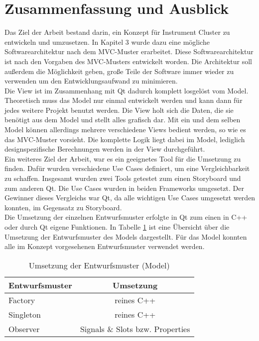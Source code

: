 \section{Zusammenfassung und Ausblick}\label{ausblick}

Das Ziel der Arbeit bestand darin, ein Konzept für Instrument Cluster zu entwickeln und umzusetzen. In Kapitel 3 wurde dazu eine mögliche Softwarearchitektur nach dem \ac{MVC}-Muster erarbeitet. Diese Softwarearchitektur ist nach den Vorgaben des \ac{MVC}-Musters entwickelt worden. Die Architektur soll außerdem die Möglichkeit geben, große Teile der Software immer wieder zu verwenden um den Entwicklungsaufwand zu minimieren.\\

Die View ist im Zusammenhang mit Qt dadurch komplett losgelöst vom Model. Theoretisch muss das Model nur einmal entwickelt werden und kann dann für jedes weitere Projekt benutzt werden. Die View holt sich die Daten, die sie benötigt aus dem Model und stellt alles grafisch dar. Mit ein und dem selben Model können allerdings mehrere verschiedene Views bedient werden, so wie es das \ac{MVC}-Muster vorsieht. Die komplette Logik liegt dabei im Model, lediglich designspezifische Berechnungen werden in der View durchgeführt.\\

Ein weiteres Ziel der Arbeit, war es ein geeignetes Tool für die Umsetzung zu finden. Dafür wurden verschiedene Use Cases definiert, um eine Vergleichbarkeit zu schaffen. Insgesamt wurden zwei Tools getestet zum einen Storyboard und zum anderen Qt. Die Use Cases wurden in beiden Frameworks umgesetzt. Der Gewinner dieses Vergleichs war Qt, da alle wichtigen Use Cases umgesetzt werden konnten, im Gegensatz zu Storyboard.\\

Die Umsetzung der einzelnen Entwurfsmuster erfolgte in Qt zum einen in C++ oder durch Qt eigene Funktionen. In Tabelle \ref{tab:patterns_model} ist eine Übersicht über die Umsetzung der Entwurfsmuster des Models dargestellt. Für das Model konnten alle im Konzept vorgesehenen Entwurfsmuster verwendet werden.\\

\begin{table}[htb]
	\caption[Umsetzung der Entwurfsmuster (View)]{Umsetzung der Entwurfsmuster (Model)}
	\label{tab:patterns_model}
	\centering
	\small
	\begin{tabular}{|l|c|}
		\hline
		Entwurfsmuster & Umsetzung \\ \hline
		Factory    & reines C++   \\ \hline
		Singleton & reines C++ \\ \hline
		Observer  & Signals \& Slots bzw. Properties  \\ \hline
	\end{tabular}
\end{table}

